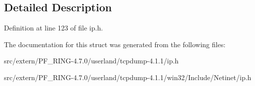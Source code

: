 \subsection{Detailed Description}


Definition at line 123 of file ip.h.



The documentation for this struct was generated from the following files:\begin{DoxyCompactItemize}
\item 
src/extern/PF\_\-RING-\/4.7.0/userland/tcpdump-\/4.1.1/ip.h\item 
src/extern/PF\_\-RING-\/4.7.0/userland/tcpdump-\/4.1.1/win32/Include/Netinet/ip.h\end{DoxyCompactItemize}

